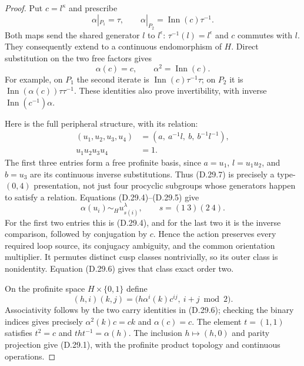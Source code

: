 \begin{proof}
Put $c=l^\kappa$ and prescribe
\[
 \alpha|_{P_1}=\tau,\qquad
 \alpha|_{P_2}=\operatorname{Inn}(c)\tau^{-1}.
                                                        \tag{D.29.5}
\]
Both maps send the shared generator $l$ to $l^\epsilon$:
$\tau^{-1}(l)=l^\epsilon$ and $c$ commutes with $l$.
They consequently extend to a continuous endomorphism of
$H$.  Direct substitution on the two free factors gives
\[
                  \alpha(c)=c,\qquad
                  \alpha^2=\operatorname{Inn}(c).      \tag{D.29.6}
\]
For example, on $P_1$ the second iterate is
$\operatorname{Inn}(c)\tau^{-1}\tau$; on $P_2$ it is
$\operatorname{Inn}(\alpha(c))\tau\tau^{-1}$.
These identities also prove invertibility, with inverse
$\operatorname{Inn}(c^{-1})\alpha$.

Here is the full peripheral structure, with its relation:
\[
 \begin{split}
 (u_1,u_2,u_3,u_4)&=(a,\ a^{-1}l,\ b,\ b^{-1}l^{-1}),\\
                         u_1u_2u_3u_4&=1.
 \end{split}                                           \tag{D.29.7}
\]
The first three entries form a free profinite basis, since
$a=u_1$, $l=u_1u_2$, and $b=u_3$ are its continuous
inverse substitutions.  Thus (D.29.7) is precisely a
type-$(0,4)$ presentation, not just four procyclic subgroups
whose generators happen to satisfy a relation.
Equations (D.29.4)--(D.29.5) give
\[
 \alpha(u_i)\sim_H u_{s(i)}^\lambda,
                  \qquad s=(1\ 3)(2\ 4).              \tag{D.29.8}
\]
For the first two entries this is (D.29.4), and for the last
two it is the inverse comparison, followed by conjugation
by $c$.  Hence the action preserves every required loop
source, its conjugacy ambiguity, and the common orientation
multiplier.  It permutes distinct cusp classes nontrivially,
so its outer class is nonidentity.  Equation (D.29.6) gives
that class exact order two.

On the profinite space $H\times\{0,1\}$ define
\[
 (h,i)(k,j)=
   \bigl(h\alpha^i(k)c^{ij},\ i+j\bmod2\bigr).
                                                        \tag{D.29.9}
\]
Associativity follows by the two carry identities in
(D.29.6); checking the binary indices gives precisely
$\alpha^2(k)c=ck$ and $\alpha(c)=c$.
The element $t=(1,1)$ satisfies $t^2=c$ and
$tht^{-1}=\alpha(h)$.  The inclusion $h\mapsto(h,0)$
and parity projection give (D.29.1), with the profinite
product topology and continuous operations.


\end{proof}
